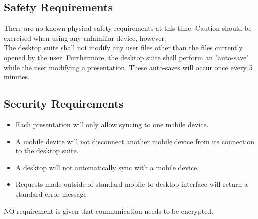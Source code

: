 \documentclass{article}
\begin{document}
\subsection{Safety Requirements}
There are no known physical safety requirements at this time.  Caution should be exercised when using any unfamiliar device, however.\\

The desktop suite shall not modify any user files other than the files currently opened by the user.
Furthermore, the desktop suite shall perform an "auto-save" while the user modifying a presentation.  These auto-saves will occur once every 5 minutes.
\subsection{Security Requirements}
\begin{itemize}
    \item Each presentation will only allow syncing to one mobile device.
    \item A mobile device will not disconnect another mobile device from its connection to the desktop suite.
    \item A desktop will not automatically sync with a mobile device.
    \item Requests made outside of standard mobile to desktop interface will return a standard error message.
\end{itemize}
NO requirement is given that communication needs to be encrypted.\\
\end{document}
